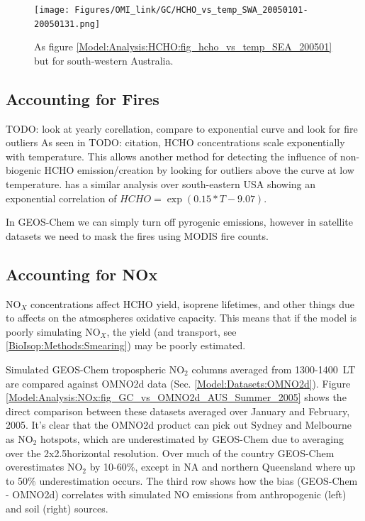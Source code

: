     \begin{figure}
      \texttt{[image: Figures/OMI\_link/GC/HCHO\_vs\_temp\_SWA\_20050101-20050131.png]}
      \caption{%
        As figure \ref{Model:Analysis:HCHO:fig_hcho_vs_temp_SEA_200501} but for south-western Australia.
      }
      \label{Model:Analysis:HCHO:fig_hcho_vs_temp_SWA_200501}
    \end{figure}
    
  \subsection{Accounting for Fires}
  
    TODO: look at yearly corellation, compare to exponential curve and look for fire outliers
    As seen in TODO: citation, HCHO concentrations scale exponentially with temperature.
    This allows another method for detecting the influence of non-biogenic HCHO emission/creation by looking for outliers above the curve at low temperature.
    \cite{Zhu2013_poster} has a similar analysis over south-eastern USA showing an exponential correlation of ${HCHO} = \exp(0.15*{T}-9.07)$.
    
    In GEOS-Chem we can simply turn off pyrogenic emissions, however in satellite datasets we need to mask the fires using MODIS fire counts.
    
    
  \subsection{Accounting for NOx}
  \label{Model:Analysis:NOx}
    
    NO$_X$ concentrations affect HCHO yield, isoprene lifetimes, and other things due to affects on the atmospheres oxidative capacity.
    This means that if the model is poorly simulating NO$_X$, the yield (and transport, see \ref{BioIsop:Methods:Smearing}) may be poorly estimated.
    
    Simulated GEOS-Chem tropospheric NO$_2$ columns averaged from 1300-1400~LT are compared against OMNO2d data (Sec. \ref{Model:Datasets:OMNO2d}). 
    Figure \ref{Model:Analysis:NOx:fig_GC_vs_OMNO2d_AUS_Summer_2005} shows the direct comparison between these datasets averaged over January and February, 2005.
    It's clear that the OMNO2d product can pick out Sydney and Melbourne as NO$_2$ hotspots, which are underestimated by GEOS-Chem due to averaging over the 2x2.5\degr horizontal resolution.
    Over much of the country GEOS-Chem overestimates NO$_2$ by 10-60\%, except in NA and northern Queensland where up to 50\% underestimation occurs.
    The third row shows how the bias (GEOS-Chem - OMNO2d) correlates with simulated NO emissions from anthropogenic (left) and soil (right) sources.
    
